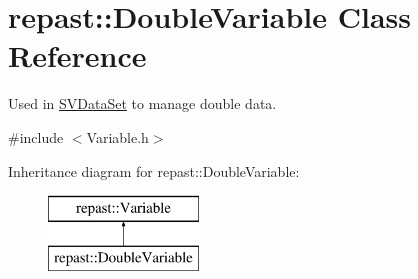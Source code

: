 \hypertarget{classrepast_1_1_double_variable}{\section{repast\-:\-:Double\-Variable Class Reference}
\label{classrepast_1_1_double_variable}
}


Used in \hyperlink{classrepast_1_1_s_v_data_set}{S\-V\-Data\-Set} to manage double data.  




{\ttfamily \#include $<$Variable.\-h$>$}

Inheritance diagram for repast\-:\-:Double\-Variable\-:\begin{figure}[H]
\begin{center}
\leavevmode
\includegraphics[height=2.000000cm]{classrepast_1_1_double_variable}
\end{center}
\end{figure}
